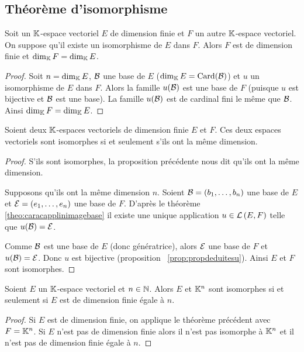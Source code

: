 \subsection{Théorème d'isomorphisme}

\begin{prop}
  Soit un \(\mathbb{K}\)-espace vectoriel \(E\) de dimension finie et \(F\) un autre \(\mathbb{K}\)-espace vectoriel. On suppose qu'il existe un isomorphisme de \(E\) dans \(F\). Alors \(F\) est de dimension finie et \(\operatorname{dim}_{\mathbb{K}} F = \operatorname{dim}_{\mathbb{K}} E\).
\end{prop}
\begin{proof}
  Soit \(n = \operatorname{dim}_{\mathbb{K}} E\), \(\mathcal{B}\) une base de \(E\) (\(\operatorname{dim}_{\mathbb{K}} E = \operatorname{Card}(\mathcal{B})\)) et \(u\) un isomorphisme de \(E\) dans \(F\). Alors la famille \(u(\mathcal{B})\) est une base de \(F\) (puisque \(u\) est bijective et \(\mathcal{B}\) est une base). La famille \(u(\mathcal{B})\) est de cardinal fini le même que \(\mathcal{B}\). Ainsi \(\operatorname{dim}_{\mathbb{K}} F = \operatorname{dim}_{\mathbb{K}} E\).
\end{proof}

\begin{theo}
  Soient deux \(\mathbb{K}\)-espaces vectoriels de dimension finie \(E\) et \(F\). Ces deux espaces vectoriels sont isomorphes si et seulement s'ils ont la même dimension.
\end{theo}
\begin{proof}
  S'ils sont isomorphes, la proposition précédente nous dit qu'ils ont la même dimension.

  Supposons qu'ils ont la même dimension \(n\). Soient \(\mathcal{B}=(b_1, \ldots, b_n)\) une base de \(E\) et \(\mathcal{E}=(e_1, \ldots, e_n)\) une base de \(F\). D'après le théorème~
  \ref{theo:caracapplinimagebase} il existe une unique application \(u \in \mathcal{L}\left(E,F\right)\) telle que \(u(\mathcal{B})=\mathcal{E}\).

  Comme \(\mathcal{B}\) est une base de \(E\) (donc génératrice), alors \(\mathcal{E}\) une base de \(F\) et \(u(\mathcal{B})=\mathcal{E}\). Donc \(u\) est bijective (proposition~
  \ref{prop:propdeduitesu}). Ainsi \(E\) et \(F\) sont isomorphes.
\end{proof}

\begin{corth}
  Soient \(E\) un \(\mathbb{K}\)-espace vectoriel et \(n \in \mathbb{N}\). Alors \(E\) et \(\mathbb{K}^n\) sont isomorphes si et seulement si \(E\) est de dimension finie égale à \(n\).
\end{corth}
\begin{proof}
  Si \(E\) est de dimension finie, on applique le théorème précédent avec \(F=\mathbb{K}^n\). Si \(E\) n'est pas de dimension finie alors il n'est pas isomorphe à \(\mathbb{K}^n\) et il n'est pas de dimension finie égale à \(n\).
\end{proof}

